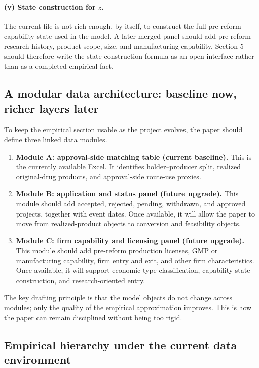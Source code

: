 \documentclass[12pt]{article}
\begin{document}
\paragraph{(v) State construction for \(z\).}
The current file is not rich enough, by itself, to construct the full pre-reform capability state used
in the model. A later merged panel should add pre-reform research history, product scope, size,
and manufacturing capability. Section 5 should therefore write the state-construction formula as an
open interface rather than as a completed empirical fact.

\subsection{A modular data architecture: baseline now, richer layers later}

To keep the empirical section usable as the project evolves, the paper should define three linked
data modules.

\begin{enumerate}
\item \textbf{Module A: approval-side matching table (current baseline).}
This is the currently available Excel. It identifies holder--producer split, realized original-drug
products, and approval-side route-use proxies.

\item \textbf{Module B: application and status panel (future upgrade).}
This module should add accepted, rejected, pending, withdrawn, and approved projects, together
with event dates. Once available, it will allow the paper to move from realized-product objects to
conversion and feasibility objects.

\item \textbf{Module C: firm capability and licensing panel (future upgrade).}
This module should add pre-reform production licenses, GMP or manufacturing capability, firm
entry and exit, and other firm characteristics. Once available, it will support economic type
classification, capability-state construction, and research-oriented entry.
\end{enumerate}

The key drafting principle is that the model objects do not change across modules; only the quality
of the empirical approximation improves. This is how the paper can remain disciplined without
being too rigid.

\subsection{Empirical hierarchy under the current data environment}
\end{document}
